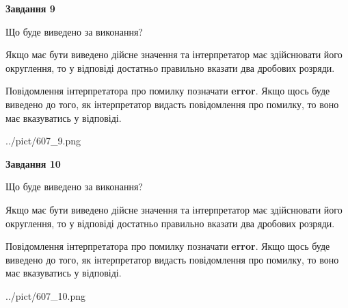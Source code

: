 \documentclass[12pt, ukrainian]{article}
\begin{document}
{\begin {Large}
{\begin {center}\textbf{Завдання 9}\end {center}}\par
Що буде виведено за виконання? \par

Якщо має бути виведено дійсне значення та інтерпретатор має здійснювати його округлення, 
то у відповіді достатньо правильно вказати два дробових розряди.

Повідомлення інтерпретатора про помилку позначати \textbf{error}.
Якщо щось буде виведено до того, як інтерпретатор видасть повідомлення про помилку, 
то воно має вказуватись у відповіді. \par

\begin{center}
	{../pict/607_9.png}
\end{center}
\newpage

{\begin {center}\textbf{Завдання 10}\end {center}}\par
Що буде виведено за виконання? \par

Якщо має бути виведено дійсне значення та інтерпретатор має здійснювати його округлення, 
то у відповіді достатньо правильно вказати два дробових розряди.

Повідомлення інтерпретатора про помилку позначати \textbf{error}.
Якщо щось буде виведено до того, як інтерпретатор видасть повідомлення про помилку, 
то воно має вказуватись у відповіді. \par

\begin{center}
	{../pict/607_10.png}
\end{center}
\newpage

\end {Large}}
\end{document}

